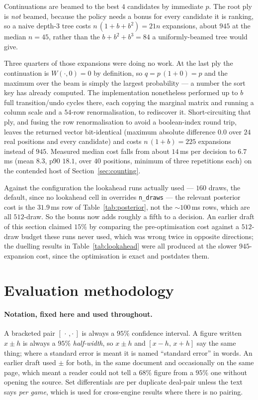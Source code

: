 \documentclass[11pt,letterpaper]{article}
\begin{document}
Continuations are beamed to the best $4$ candidates by immediate $p$. The root
ply is \emph{not} beamed, because the policy needs a bonus for every candidate it
is ranking, so a naive depth-3 tree costs $n\,(1 + b + b^2) = 21n$ expansions,
about $945$ at the median $n = 45$, rather than the $b + b^2 + b^3 = 84$ a
uniformly-beamed tree would give.

Three quarters of those expansions were doing no work. At the last ply the
continuation is $W(\cdot, 0) = 0$ by definition, so $q = p\,(1 + 0) = p$ and the
maximum over the beam is simply the largest probability --- a number the sort key
has already computed. The implementation nonetheless performed up to $b$ full
transition/undo cycles there, each copying the marginal matrix and running a
column scale and a $54$-row renormalisation, to rediscover it. Short-circuiting
that ply, and fusing the row renormalisation to avoid a boolean-index round trip,
leaves the returned vector bit-identical (maximum absolute difference $0.0$ over
$24$ real positions and every candidate) and costs $n\,(1 + b) = 225$ expansions
instead of $945$. Measured median cost falls from about $14$\,ms per decision to
$6.7$\,ms (mean $8.3$, p90 $18.1$, over $40$ positions, minimum of three
repetitions each) on the contended host of Section~\ref{sec:counting}.

Against the configuration the lookahead runs actually used --- $160$ draws, the
 default, since no lookahead cell in
 overrides \texttt{n\_draws} --- the relevant
posterior cost is the $31.9$\,ms row of Table~\ref{tab:posterior}, not the
$\sim\!100$\,ms rows, which are all $512$-draw. So the bonus now adds roughly a
fifth to a decision. An earlier draft of this section claimed $15\%$ by comparing
the pre-optimisation cost against a $512$-draw budget these runs never used,
which was wrong twice in opposite directions; the duelling results in
Table~\ref{tab:lookahead} were all produced at the slower $945$-expansion cost,
since the optimisation is exact and postdates them.

\section{Evaluation methodology}
\label{sec:eval}

\paragraph{Notation, fixed here and used throughout.} A bracketed pair
$[\,\cdot\,,\cdot\,]$ is always a $95\%$ confidence interval. A figure
written $x \pm h$ is always a $95\%$ \emph{half-width}, so $x \pm h$ and
$[x-h,\,x+h]$ say the same thing; where a standard error is meant it is named
``standard error'' in words. An earlier draft used $\pm$ for both, in the same
document and occasionally on the same page, which meant a reader could not tell
a $68\%$ figure from a $95\%$ one without opening the source. Set
differentials are per duplicate deal-pair unless the text says \emph{per
game}, which is used for cross-engine results where there is no pairing.
\end{document}
